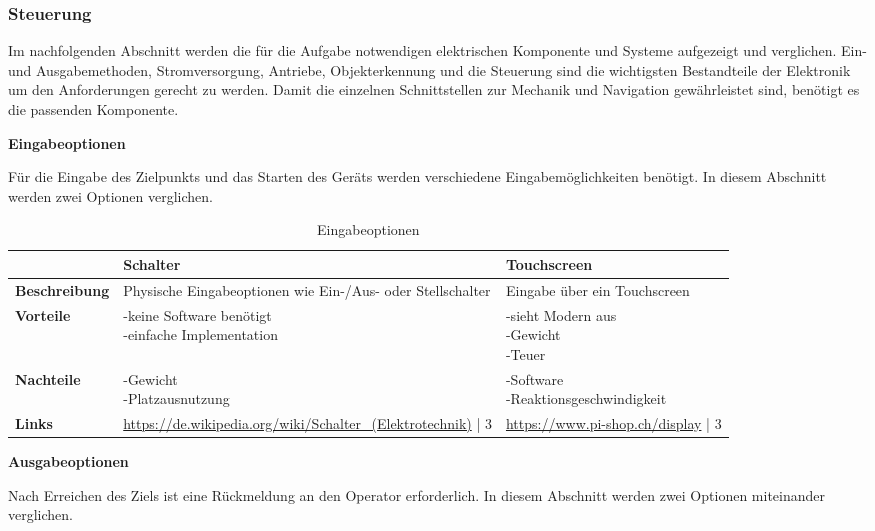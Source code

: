 \newpage
\subsubsection{Steuerung}

Im nachfolgenden Abschnitt werden die für die Aufgabe notwendigen elektrischen Komponente und Systeme aufgezeigt und verglichen.  Ein- und Ausgabemethoden, Stromversorgung, Antriebe, Objekterkennung und die Steuerung sind die wichtigsten Bestandteile der Elektronik um den Anforderungen gerecht zu werden. Damit die einzelnen Schnittstellen zur Mechanik und Navigation gewährleistet sind, benötigt es die passenden Komponente.

\textbf{Eingabeoptionen}

Für die Eingabe des Zielpunkts und das Starten des Geräts werden verschiedene Eingabemöglichkeiten benötigt. In diesem Abschnitt werden zwei Optionen verglichen.

\begin{table}[H]
\centering
\small
\begin{tabularx}{\textwidth}{|l|X|X|}
\hline
  \textbf{} & \textbf{Schalter} & \textbf{Touchscreen} \\
  \hline
  \textbf{Beschreibung}  & Physische Eingabeoptionen wie Ein-/Aus- oder Stellschalter & Eingabe über ein Touchscreen\\
  \hline
  \textbf{Vorteile}  & \makecell{-keine Software benötigt\\-einfache Implementation} & \makecell{-sieht Modern aus \\ -Gewicht \\-Teuer}\\
  \hline
  \textbf{Nachteile} & \makecell{-Gewicht \\-Platzausnutzung} & \makecell{-Software\\-Reaktionsgeschwindigkeit}\\
  \hline
  \textbf{Links} &  \url{https://de.wikipedia.org/wiki/Schalter_(Elektrotechnik)} | 3 & \url{https://www.pi-shop.ch/display} | 3\\
  \hline
\end{tabularx}
\caption{Eingabeoptionen}
\label{table:inputs-compare}
\end{table}

\textbf{Ausgabeoptionen}

Nach Erreichen des Ziels ist eine Rückmeldung an den Operator erforderlich. In diesem Abschnitt werden zwei Optionen miteinander verglichen.

